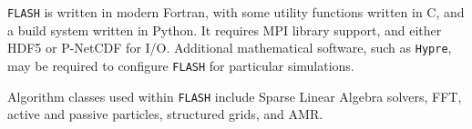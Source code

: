 \documentclass[12pt,titlepage]{article}
\begin{document}
\texttt{FLASH} is written in modern Fortran, with some utility
functions written in C, and a build system written in Python.  It
requires MPI library support, and either HDF5 or P-NetCDF for I/O.
Additional mathematical software, such as \texttt{Hypre}, may be
required to configure \texttt{FLASH} for particular simulations.

Algorithm classes used within \texttt{FLASH} include Sparse Linear
Algebra solvers, FFT, active and passive particles, structured grids,
and AMR.
\end{document}
